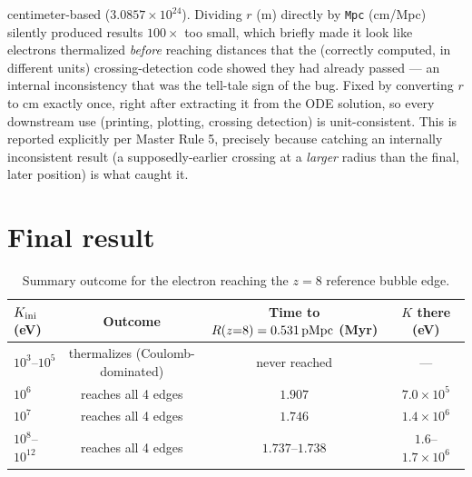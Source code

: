 \documentclass[11pt,a4paper]{article}
\newcommand{\pMpc}{\,{\rm pMpc}}
\begin{document}
\begin{enumerate}
      centimeter-based ($3.0857\times10^{24}$). Dividing $r$ (m) directly by \texttt{Mpc} (cm/Mpc)
      silently produced results $100\times$ too small, which briefly made it look like electrons
      thermalized \emph{before} reaching distances that the (correctly computed, in different units)
      crossing-detection code showed they had already passed --- an internal inconsistency that was the
      tell-tale sign of the bug. Fixed by converting $r$ to cm exactly once, right after extracting it from
      the ODE solution, so every downstream use (printing, plotting, crossing detection) is unit-consistent.
      This is reported explicitly per Master Rule 5, precisely because catching an internally inconsistent
      result (a supposedly-earlier crossing at a \emph{larger} radius than the final, later position) is
      what caught it.
\end{enumerate}

\section{Final result}
\label{sec:final}

\begin{table}[h]
\centering\small
\begin{tabular}{@{}lccc@{}}
\toprule
$K_{\rm ini}$ (eV) & Outcome & Time to $R(z{=}8)=0.531\pMpc$ (Myr) & $K$ there (eV) \\
\midrule
$10^3$--$10^5$ & thermalizes (Coulomb-dominated) & never reached & --- \\
$10^6$  & reaches all 4 edges & $1.907$ & $7.0\times10^5$ \\
$10^7$  & reaches all 4 edges & $1.746$ & $1.4\times10^6$ \\
$10^8$--$10^{12}$ & reaches all 4 edges & $1.737$--$1.738$ & $1.6$--$1.7\times10^6$ \\
\bottomrule
\end{tabular}
\caption{Summary outcome for the electron reaching the $z=8$ reference bubble edge.}
\label{tab:summary}
\end{table}
\end{document}

